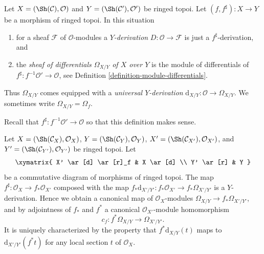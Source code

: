 \begin{definition}
\label{definition-sheaf-differentials}
Let $X = (\Sh(\mathcal{C}), \mathcal{O})$ and
$Y = (\Sh(\mathcal{C}'), \mathcal{O}')$ be ringed topoi.
Let $(f, f^\sharp) : X \to Y$ be a morphism of ringed topoi.
In this situation
\begin{enumerate}
\item for a sheaf $\mathcal{F}$ of $\mathcal{O}$-modules a
{\it $Y$-derivation} $D : \mathcal{O} \to \mathcal{F}$ is just a
$f^\sharp$-derivation, and
\item the {\it sheaf of differentials $\Omega_{X/Y}$ of $X$ over $Y$}
is the module of differentials of
$f^\sharp : f^{-1}\mathcal{O}' \to \mathcal{O}$,
see Definition \ref{definition-module-differentials}.
\end{enumerate}
Thus $\Omega_{X/Y}$ comes equipped with a {\it universal $Y$-derivation}
$\text{d}_{X/Y} : \mathcal{O} \longrightarrow \Omega_{X/Y}$. We sometimes
write $\Omega_{X/Y} = \Omega_f$.
\end{definition}

\noindent
Recall that $f^\sharp : f^{-1}\mathcal{O}' \to \mathcal{O}$ so that
this definition makes sense.

\begin{lemma}
\label{lemma-functoriality-differentials-ringed-topoi}
Let
$X = (\Sh(\mathcal{C}_X), \mathcal{O}_X)$,
$Y = (\Sh(\mathcal{C}_Y), \mathcal{O}_Y)$,
$X' = (\Sh(\mathcal{C}_{X'}), \mathcal{O}_{X'})$, and
$Y' = (\Sh(\mathcal{C}_{Y'}), \mathcal{O}_{Y'})$ be ringed topoi.
Let
$$
\xymatrix{
X' \ar[d] \ar[r]_f & X \ar[d] \\
Y' \ar[r] & Y
}
$$
be a commutative diagram of morphisms of ringed topoi. The map
$f^\sharp : \mathcal{O}_X \to f_*\mathcal{O}_{X'}$ composed with the map
$f_*\text{d}_{X'/Y'} : f_*\mathcal{O}_{X'} \to f_*\Omega_{X'/Y'}$ is a
$Y$-derivation. Hence we obtain a canonical map of $\mathcal{O}_X$-modules
$\Omega_{X/Y} \to f_*\Omega_{X'/Y'}$, and by
adjointness of $f_*$ and $f^*$ a
canonical $\mathcal{O}_{X'}$-module homomorphism
$$
c_f : f^*\Omega_{X/Y} \longrightarrow \Omega_{X'/Y'}.
$$
It is uniquely characterized by the property that
$f^*\text{d}_{X/Y}(t)$ maps to $\text{d}_{X'/Y'}(f^* t)$
for any local section $t$ of $\mathcal{O}_X$.
\end{lemma}

